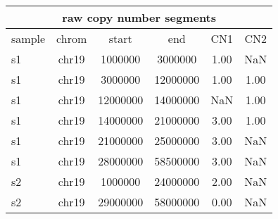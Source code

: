 \documentclass{standalone}
\begin{document}
\begin{tabular}{|l|c|c|c|c|c|}
\hline
\multicolumn{6}{|c|}{\textbf{raw copy number segments}}\\
\hline 

sample & chrom & start & end & CN1 & CN2 \\
\hline
s1 & chr19 & 1000000 & 3000000 & 1.00 & NaN \\
s1 & chr19 & 3000000 & 12000000 & 1.00 & 1.00 \\
s1 & chr19 & 12000000 & 14000000 & NaN & 1.00 \\
s1 & chr19 & 14000000 & 21000000 & 3.00 & 1.00 \\
s1 & chr19 & 21000000 & 25000000 & 3.00 & NaN \\
s1 & chr19 & 28000000 & 58500000 & 3.00 & NaN \\
s2 & chr19 & 1000000 & 24000000 & 2.00 & NaN \\
s2 & chr19 & 29000000 & 58000000 & 0.00 & NaN \\
\hline
\end{tabular}
\end{document}
